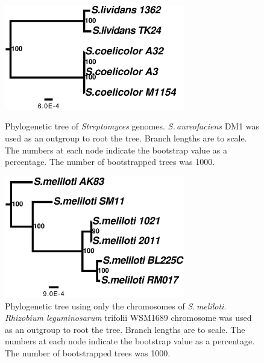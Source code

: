 \documentclass[11pt]{article}
\newcommand{\smel}{\textit{S.\,meliloti}\xspace}
\newcommand{\strep}{\textit{Streptomyces}\xspace}
\newcommand{\saur}{\textit{S.\,aureofaciens}\xspace}
\newcommand{\rleg}{\textit{Rhizobium leguminosarum}\xspace}
\begin{document}
		\begin{figure}[H]
		\begin{center}
			\includegraphics[width=0.7\textwidth]{./figs/Strep_chrom_figtree_raw_11Sep20.pdf}
			\caption{\label{fig:streptree} Phylogenetic tree of \strep genomes. \saur DM1 was used as an outgroup to root the tree. Branch lengths are to scale. The numbers at each node indicate the bootstrap value as a percentage. The number of bootstrapped trees was 1000.}
		\end{center}
			\vspace*{\floatsep}%
		\begin{center}
			\includegraphics[width=0.7\textwidth]{./figs/SinoC_chrom_figtree_raw_11Sep20.pdf}
			\caption{\label{fig:sinoCtree} Phylogenetic tree using only the chromosomes of \smel. \rleg trifolii WSM1689 chromosome was used as an outgroup to root the tree. Branch lengths are to scale. The numbers at each node indicate the bootstrap value as a percentage. The number of bootstrapped trees was 1000.}
		\end{center}
	\end{figure}
		
\end{document}
